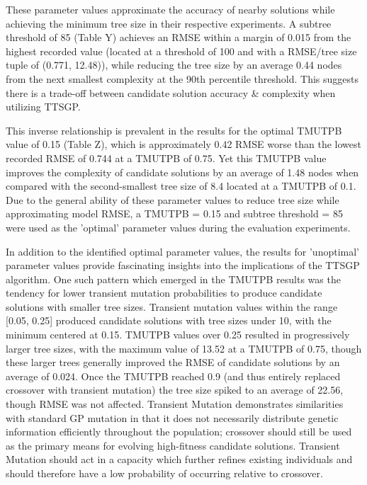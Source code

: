 \documentclass[a4paper, twocolumn]{article}
\begin{document}
These parameter values approximate the accuracy of nearby solutions while achieving the minimum tree size in their respective experiments. A subtree threshold of 85 (Table Y) achieves an RMSE within a margin of 0.015 from the highest recorded value (located at a threshold of 100 and with a RMSE/tree size tuple of (0.771, 12.48)), while reducing the tree size by an average 0.44 nodes from the next smallest complexity at the 90th percentile threshold. This suggests there is a trade-off between candidate solution accuracy \& complexity when utilizing TTSGP. 

This inverse relationship is prevalent in the results for the optimal TMUTPB value of 0.15 (Table Z), which is approximately 0.42 RMSE worse than the lowest recorded RMSE of 0.744 at a TMUTPB of 0.75. Yet this TMUTPB value improves the complexity of candidate solutions by an average of 1.48 nodes when compared with the second-smallest tree size of 8.4 located at a TMUTPB of 0.1. Due to the general ability of these parameter values to reduce tree size while approximating model RMSE, a TMUTPB = 0.15 and subtree threshold = 85 were used as the 'optimal' parameter values during the evaluation experiments.

In addition to the identified optimal parameter values, the results for 'unoptimal' parameter values provide fascinating insights into the implications of the TTSGP algorithm. One such pattern which emerged in the TMUTPB results was the tendency for lower transient mutation probabilities to produce candidate solutions with smaller tree sizes. Transient mutation values within the range [0.05, 0.25] produced candidate solutions with tree sizes under 10, with the minimum centered at 0.15. TMUTPB values over 0.25 resulted in progressively larger tree sizes, with the maximum value of 13.52 at a TMUTPB of 0.75, though these larger trees generally improved the RMSE of candidate solutions by an average of 0.024. Once the TMUTPB reached 0.9 (and thus entirely replaced crossover with transient mutation) the tree size spiked to an average of 22.56, though RMSE was not affected. Transient Mutation demonstrates similarities with standard GP mutation in that it does not necessarily distribute genetic information efficiently throughout the population; crossover should still be used as the primary means for evolving high-fitness candidate solutions. Transient Mutation should act in a capacity which further refines existing individuals and should therefore have a low probability of occurring relative to crossover.
\end{document}
